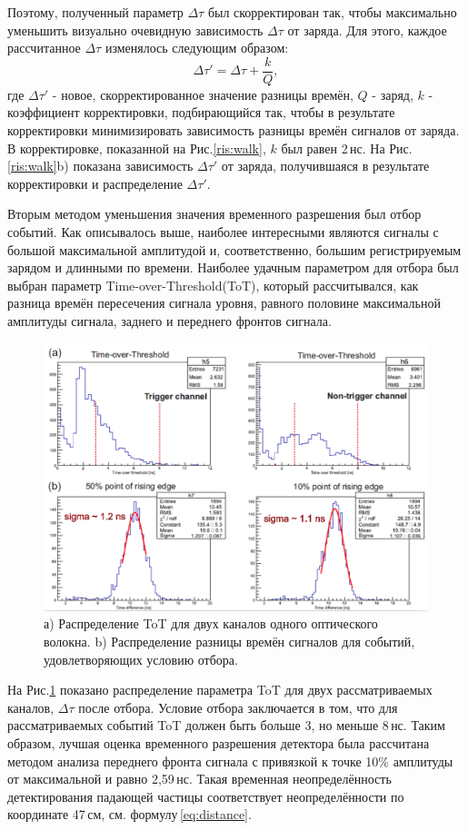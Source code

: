 Поэтому, полученный параметр $\Delta\tau$ был скорректирован так, чтобы максимально уменьшить визуально очевидную зависимость $\Delta\tau$ от заряда. Для этого, каждое рассчитанное $\Delta\tau$ изменялось следующим образом:
\begin{equation}
\Delta\tau' = \Delta\tau + \frac{k}{Q},
\end{equation}
где $\Delta\tau'$ - новое, скорректированное значение разницы времён, $Q$ - заряд, $k$ - коэффициент корректировки, подбирающийся так, чтобы в результате корректировки минимизировать зависимость разницы времён сигналов от заряда. В корректировке, показанной на Рис.\ref{ris:walk}, $k$ был равен 2\,нс.
На Рис.\ref{ris:walk}b) показана зависимость $\Delta\tau'$ от заряда, получившаяся в результате корректировки и распределение $\Delta\tau'$. 

Вторым методом уменьшения значения временного разрешения был отбор событий. Как описывалось выше, наиболее интересными являются сигналы с большой максимальной амплитудой и, соответственно, большим регистрируемым зарядом и длинными по времени. Наиболее удачным параметром для отбора был выбран параметр Time-over-Threshold(ToT), который рассчитывался, как разница времён пересечения сигнала уровня, равного половине максимальной амплитуды сигнала, заднего и переднего фронтов сигнала.

\begin{figure}[!h]
	\centering
	\includegraphics[width=0.8\linewidth]{totcorr.png}
	\caption{а) Распределение ToT для двух каналов одного оптического волокна. b) Распределение разницы времён сигналов для событий, удовлетворяющих условию отбора. }\label{ris:totcorr}
\end{figure}

На Рис.\ref{ris:totcorr} показано распределение параметра ToT для двух рассматриваемых каналов, $\Delta\tau$ после отбора. Условие отбора заключается в том, что для рассматриваемых событий ToT должен быть больше 3, но меньше 8\,нс.
Таким образом, лучшая оценка временного разрешения детектора была рассчитана методом анализа переднего фронта сигнала с привязкой к точке 10\% амплитуды от максимальной и равно 2,59\,нс. Такая временная неопределённость детектирования падающей частицы соответствует неопределённости по координате 47\,см, см. формулу\,\ref{eq:distance}. 

